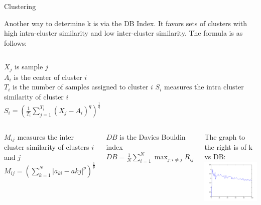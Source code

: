 \documentclass[final,t]{beamer}
\begin{document}
\begin{frame}{}
\begin{columns}[t]
\begin{column}{.3\linewidth}
\begin{block}{Clustering}
       \par Another way to
       determine k is via the DB Index.  It favors sets of clusters
       with high intra-cluster similarity and low inter-cluster
       similarity.  The formula is as follows:\newline


\begin{columns}[c,c]
$X_j$ is sample $j$\\
$A_i$ is the center of cluster $i$\\
$T_i$ is the number of samples assigned to cluster $i$\newline
$S_i$ measures the intra cluster similarity of cluster $i$\\
$S_i = (\frac{1}{T_i} \sum\limits_{j=1}^{T_i} (X_j -
A_i)^q)^{\frac{1}{q}}$\newline
\end{columns} 


\begin{columns}[c,c]
$M_{ij}$ measures the inter cluster similarity of clusters $i$ and $j$\\
$M_{ij} = (\sum\limits_{k=1}^{N} |a_{ki} - a{kj}|^p)^{\frac{1}{p}}$\newline

$DB$ is the Davies Bouldin index\\
$DB = \frac{1}{N} \sum\limits_{i=1}^N \max_{j:i \neq j} R_{ij}$\newline

The graph to the right is of k vs DB:\newline
  \includegraphics[width=0.97\linewidth]{images/davies_k_vs_davies_index.png}
\end{columns} 


\end{block}
\end{column}
\end{columns}
\end{frame}
\end{document}
